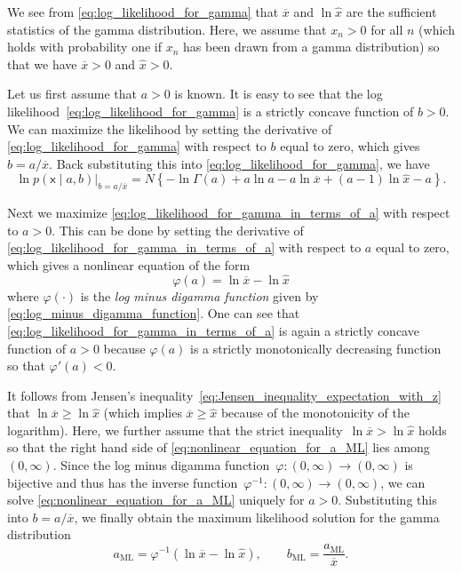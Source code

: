 \documentclass[12pt,a4paper]{article}
\begin{document}
We see from \eqref{eq:log_likelihood_for_gamma} that
$\overline{x}$ and $\ln\widehat{x}$ are the sufficient statistics of the gamma distribution.
Here, we assume that $x_n > 0$ for all $n$
(which holds with probability one if $x_n$ has been drawn from a gamma distribution)
so that we have $\overline{x} > 0$ and $\widehat{x} > 0$.

Let us first assume that $a > 0$ is known.
It is easy to see that the log likelihood~\eqref{eq:log_likelihood_for_gamma} is
a strictly concave function of $b > 0$.
We can maximize the likelihood by setting the derivative of \eqref{eq:log_likelihood_for_gamma}
with respect to $b$ equal to zero, which gives $b = a/\overline{x}$.
Back substituting this into \eqref{eq:log_likelihood_for_gamma},
we have
\begin{equation}
\left. \ln p\left(\bm{\mathsf{x}} \middle| a, b \right) \right|_{b = a/\overline{x}}
= N
\left\{
-\ln\Gamma(a) + a \ln a - a \ln\overline{x} + (a - 1) \ln\widehat{x} - a
\right\} .
\label{eq:log_likelihood_for_gamma_in_terms_of_a}
\end{equation}

Next we maximize \eqref{eq:log_likelihood_for_gamma_in_terms_of_a} with respect to $a > 0$.
This can be done by setting the derivative of \eqref{eq:log_likelihood_for_gamma_in_terms_of_a}
with respect to $a$ equal to zero, which gives a nonlinear equation of the form
\begin{equation}
\varphi(a) = \ln\overline{x} - \ln\widehat{x}
\label{eq:nonlinear_equation_for_a_ML}
\end{equation}
where $\varphi(\cdot)$ is the \emph{log minus digamma function} given by
\eqref{eq:log_minus_digamma_function}.
One can see that \eqref{eq:log_likelihood_for_gamma_in_terms_of_a} is again
a strictly concave function of $a > 0$
because $\varphi(a)$ is a strictly monotonically decreasing function
so that $\varphi'(a) < 0$.

It follows from Jensen's inequality~\eqref{eq:Jensen_inequality_expectation_with_z}
that $\ln \overline{x} \geqslant \ln \widehat{x}$
(which implies $\overline{x} \geqslant \widehat{x}$ because of the monotonicity of the logarithm).
Here, we further assume that the strict inequality~$\ln \overline{x} > \ln \widehat{x}$ holds
so that the right hand side of \eqref{eq:nonlinear_equation_for_a_ML} lies
among $(0, \infty)$.
Since the log minus digamma function~$\varphi: (0, \infty) \to (0, \infty)$ is bijective
and thus has the inverse function~$\varphi^{-1}: (0, \infty) \to (0, \infty)$,
we can solve \eqref{eq:nonlinear_equation_for_a_ML} uniquely for $a > 0$.
Substituting this into $b = a/\overline{x}$,
we finally obtain the maximum likelihood solution for the gamma distribution
\begin{equation}
a_{\text{ML}} = \varphi^{-1}\left( \ln\overline{x} - \ln\widehat{x} \right), \qquad
b_{\text{ML}} = \frac{a_{\text{ML}}}{\overline{x}} .
\end{equation}
\end{document}
